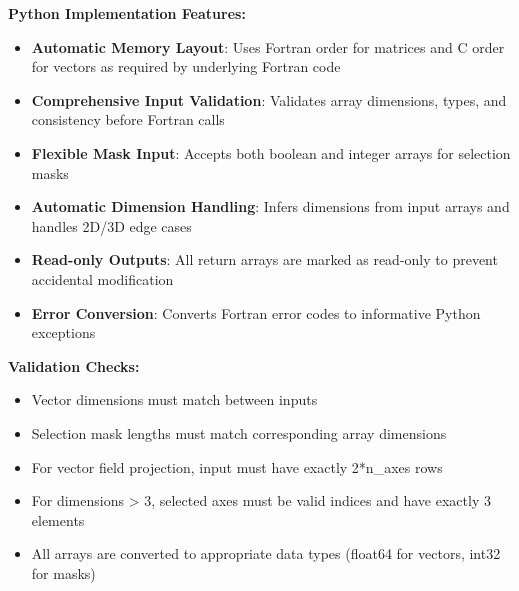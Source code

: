 \documentclass[11pt]{article}
\begin{document}
\textbf{Python Implementation Features:}
\begin{itemize}
    \item \textbf{Automatic Memory Layout}: Uses Fortran order for matrices and C order for vectors as required by underlying Fortran code
    \item \textbf{Comprehensive Input Validation}: Validates array dimensions, types, and consistency before Fortran calls
    \item \textbf{Flexible Mask Input}: Accepts both boolean and integer arrays for selection masks
    \item \textbf{Automatic Dimension Handling}: Infers dimensions from input arrays and handles 2D/3D edge cases
    \item \textbf{Read-only Outputs}: All return arrays are marked as read-only to prevent accidental modification
    \item \textbf{Error Conversion}: Converts Fortran error codes to informative Python exceptions
\end{itemize}

\textbf{Validation Checks:}
\begin{itemize}
    \item Vector dimensions must match between inputs
    \item Selection mask lengths must match corresponding array dimensions
    \item For vector field projection, input must have exactly 2*n\_axes rows
    \item For dimensions > 3, selected axes must be valid indices and have exactly 3 elements
    \item All arrays are converted to appropriate data types (float64 for vectors, int32 for masks)
\end{itemize}
\end{document}
